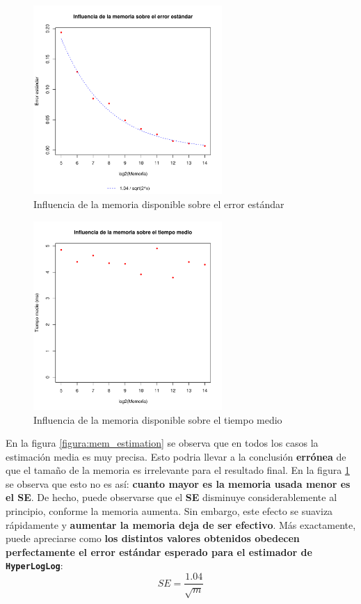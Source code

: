 \begin{figure}[h!]
    \centering
        \includegraphics[width=0.64\textwidth]{../figs/D1/mem_errors_rel.pdf}
        \caption{Influencia de la memoria disponible sobre el error estándar}
    \label{figura:mem_errors}
\end{figure}

\clearpage

\begin{figure}[h!]
    \centering
        \includegraphics[width=0.64\textwidth]{../figs/D1/mem_time_rel.pdf}
        \caption{Influencia de la memoria disponible sobre el tiempo medio}
    \label{figura:mem_time}
\end{figure}

En la figura \ref{figura:mem_estimation} se observa que en todos los casos la estimación media es muy precisa. Esto podria llevar a
la conclusión \textbf{errónea} de que el tamaño de la memoria es irrelevante para el resultado final. En la figura
\ref{figura:mem_errors} se observa que esto no es así: \textbf{cuanto mayor es la memoria usada menor es el \textbf{SE}}.
De hecho, puede observarse que el \textbf{SE} disminuye considerablemente al principio, conforme la memoria aumenta.
Sin embargo,
este efecto se suaviza rápidamente y \textbf{aumentar la memoria deja de ser efectivo}. Más exactamente, puede apreciarse como
\textbf{los distintos valores obtenidos obedecen perfectamente el error estándar esperado para el estimador de
\texttt{HyperLogLog}}:
$$SE = \frac{1.04}{\sqrt{m}}$$

